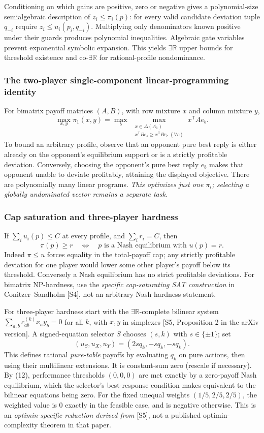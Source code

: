 \documentclass[11pt,a4paper]{article}
\providecommand{\ER}{\exists\mathbb R}
\providecommand{\coER}{\mathrm{co}\text{-}\exists\mathbb R}
\providecommand{\D}{\Delta}
\begin{document}
Conditioning on which gains are positive, zero or negative gives a polynomial-size semialgebraic description of $z_i\le\pi_i(p)$: for every valid candidate deviation tuple $q_{-i}$ require $z_i\le u_i(p_i,q_{-i})$. Multiplying only denominators known positive under their guards produces polynomial inequalities. Algebraic gate variables prevent exponential symbolic expansion. This yields $\ER$ upper bounds for threshold existence and $\coER$ for rational-profile nondominance.

\subsubsection*{The two-player single-component linear-programming identity}
For bimatrix payoff matrices $(A,B)$, with row mixture $x$ and column mixture $y$,
\[
 \max_{x,y}\pi_1(x,y)=
 \max_b\ \max_{\substack{x\in\D(A_1)\\x^\mathsf T B e_b\ge x^\mathsf T B e_c\ (\forall c)}}
 x^\mathsf T A e_b.
\tag{OPT.11}
\]
To bound an arbitrary profile, observe that an opponent pure best reply is either already on the opponent's equilibrium support or is a strictly profitable deviation. Conversely, choosing the opponent's pure best reply $e_b$ makes that opponent unable to deviate profitably, attaining the displayed objective. There are polynomially many linear programs. \emph{This optimizes just one $\pi_i$; selecting a globally undominated vector remains a separate task.}

\subsubsection*{Cap saturation and three-player hardness}
If $\sum_i u_i(p)\le C$ at every profile, and $\sum_i r_i=C$, then
\[
 \pi(p)\ge r\quad\Longleftrightarrow\quad
 p\text{ is a Nash equilibrium with }u(p)=r.
\tag{OPT.12}
\]
Indeed $\pi\le u$ forces equality in the total-payoff cap; any strictly profitable deviation for one player would lower some other player's payoff below its threshold. Conversely a Nash equilibrium has no strict profitable deviations. For bimatrix NP-hardness, use the \emph{specific cap-saturating SAT construction} in Conitzer--Sandholm [S4], not an arbitrary Nash hardness statement.

For three-player hardness start with the $\ER$-complete bilinear system
$\sum_{a,b}c^{(k)}_{ab}x_ay_b=0$ for all $k$, with $x,y$ in simplexes [S5, Proposition 2 in the arXiv version]. A signed-equation selector $S$ chooses $(s,k)$ with $s\in\{\pm1\}$; set
\[
 (u_S,u_X,u_Y)=(2s q_k,-s q_k,-s q_k).
\tag{OPT.13}
\]
This defines rational \emph{pure-table} payoffs by evaluating $q_k$ on pure actions, then using their multilinear extensions. It is constant-sum zero (rescale if necessary). By (12), performance thresholds $(0,0,0)$ are met exactly by a zero-payoff Nash equilibrium, which the selector's best-response condition makes equivalent to the bilinear equations being zero. For the fixed unequal weights $(1/5,2/5,2/5)$, the weighted value is $0$ exactly in the feasible case, and is negative otherwise. This is an \emph{optimin-specific reduction derived from} [S5], not a published optimin-complexity theorem in that paper.
\end{document}
